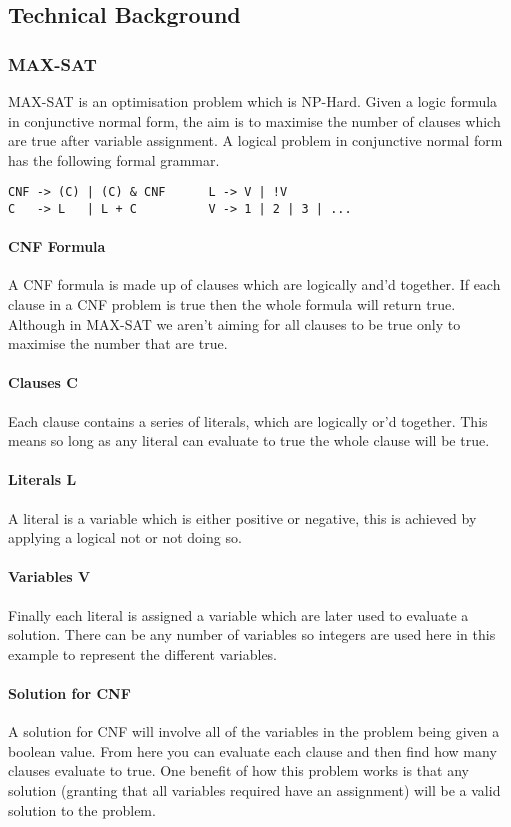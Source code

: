 \documentclass[a4paper]{article}
\begin{document}
\subsection{Technical Background}
\subsubsection{MAX-SAT}
MAX-SAT is an optimisation problem which is NP-Hard.
Given a logic formula in conjunctive normal form, the aim is to maximise the number of clauses which are true after variable assignment.
A logical problem in conjunctive normal form has the following formal grammar.
\begin{lstlisting}
CNF -> (C) | (C) & CNF      L -> V | !V
C   -> L   | L + C          V -> 1 | 2 | 3 | ...
\end{lstlisting}
\paragraph{CNF Formula}\vspace*{-6mm}
A CNF formula is made up of clauses which are logically and'd together.
If each clause in a CNF problem is true then the whole formula will return true.
Although in MAX-SAT we aren't aiming for all clauses to be true only to maximise the number that are true.
\paragraph{Clauses C}\vspace*{-4mm}
Each clause contains a series of literals, which are logically or'd together.
This means so long as any literal can evaluate to true the whole clause will be true.
\paragraph{Literals L}\vspace*{-4mm}
A literal is a variable which is either positive or negative, this is achieved by applying a logical not or not doing so.
\paragraph{Variables V}\vspace*{-4mm}
Finally each literal is assigned a variable which are later used to evaluate a solution.
There can be any number of variables so integers are used here in this example to represent the different variables.
\paragraph{Solution for CNF}
A solution for CNF will involve all of the variables in the problem being given a boolean value.
From here you can evaluate each clause and then find how many clauses evaluate to true.
One benefit of how this problem works is that any solution (granting that all variables required have an assignment) will be a valid solution to the problem.
\end{document}
